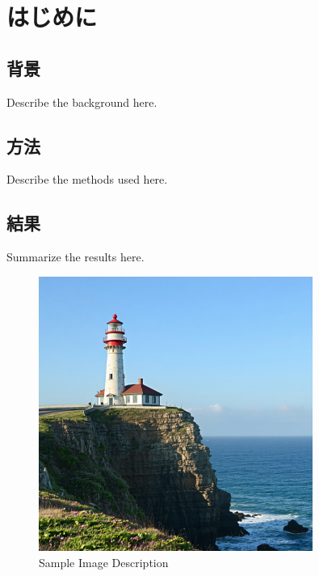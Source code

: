 \tableofcontents
\newpage

\pagestyle{fancy}
\fancyhf{}
\renewcommand{\headrulewidth}{0pt}
\makeatletter
\let\ps@plain\ps@fancy
\makeatother

\chapter{はじめに}
\section{背景}
Describe the background here.\cite{テスト}

\section{方法}
Describe the methods used here.

\section{結果}
Summarize the results here.

\begin{figure}[h!]
  \centering
  \includegraphics[width=0.8\textwidth]{pages/report/images/sample.jpg}
  \caption{Sample Image Description}
  \label{fig:sample}
\end{figure}

\newpage\clearpage
\vspace*{15pt}
\printbibliography[segment=\therefsegment,heading=subbibliography]
